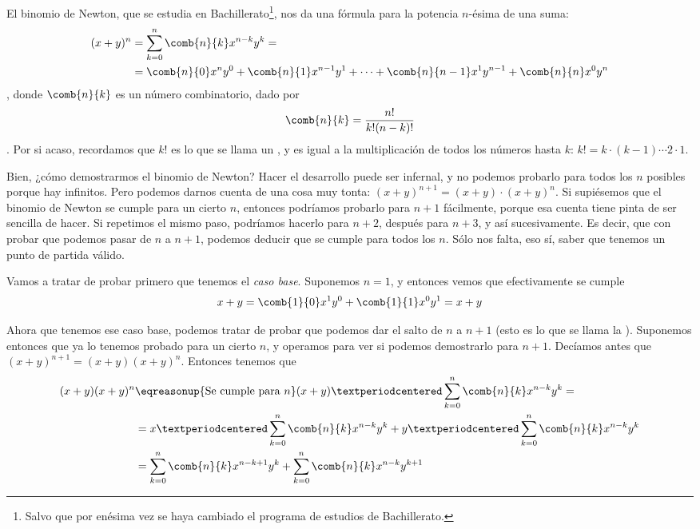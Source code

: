 \documentclass[palatino, nochap]{apuntes}
\begin{document}
El binomio de Newton, que se estudia en Bachillerato\footnote{Salvo que por enésima vez se haya cambiado el programa de estudios de Bachillerato.}, nos da una fórmula para la potencia $n$-ésima de una suma: \begin{align*} (x+y)^n &= \sum_{k=0}^n \comb{n}{k}x^{n-k}y^k = \\
&= \comb{n}{0} x^ny^0 + \comb{n}{1} x^{n-1}y^1 +  \dotsb + \comb{n}{n-1} x^1y^{n-1} + \comb{n}{n} x^0y^n \end{align*}, donde $\comb{n}{k}$ es un número combinatorio, dado por \[ \comb{n}{k} = \frac{n!}{k!(n-k)!} \]. Por si acaso, recordamos que $k!$ es lo que se llama un , y es igual a la multiplicación de todos los números hasta $k$: $k! = k · (k-1) \dotsb 2 · 1$.

Bien, ¿cómo demostrarmos el binomio de Newton? Hacer el desarrollo puede ser infernal, y no podemos probarlo para todos los $n$ posibles porque hay infinitos. Pero podemos darnos cuenta de una cosa muy tonta: $(x+y)^{n+1}= (x+y)  · (x+y)^{n}$. Si supiésemos que el binomio de Newton se cumple para un cierto $n$, entonces podríamos probarlo para $n + 1$ fácilmente, porque esa cuenta tiene pinta de ser sencilla de hacer. Si repetimos el mismo paso, podríamos hacerlo para $n+2$, después para $n+3$, y así sucesivamente. Es decir, que con probar que podemos pasar de $n$ a $n+1$, podemos deducir que se cumple para todos los $n$. Sólo nos falta, eso sí, saber que tenemos un punto de partida válido.

Vamos a tratar de probar primero que tenemos el \textit{caso base}. Suponemos $n = 1$, y entonces vemos que efectivamente se cumple \[ x+y = \comb{1}{0} x^1y^0 + \comb{1}{1} x^0 y^1 = x + y\]

Ahora que tenemos ese caso base, podemos tratar de probar que podemos dar el salto de $n$ a $n+1$ (esto es lo que se llama la ). Suponemos entonces que ya lo tenemos probado para un cierto $n$, y operamos para ver si podemos demostrarlo para $n+1$. Decíamos antes que $(x+y)^{n+1} = (x+y)(x+y)^{n}$. Entonces tenemos que \begin{align*} (x+y)(x+y)^{n} &\eqreasonup{\text{Se cumple para } n} (x+y) · \sum_{k=0}^n \comb{n}{k}x^{n-k}y^k  =  \\
&= x · \sum_{k=0}^n \comb{n}{k} x^{n-k}y^k + y · \sum_{k=0}^n \comb{n}{k} x^{n-k}y^k \\
&= \sum_{k=0}^n \comb{n}{k} x^{n-k + 1}y^k + \sum_{k=0}^n \comb{n}{k} x^{n-k}y^{k+1}
\end{align*}
\end{document}
